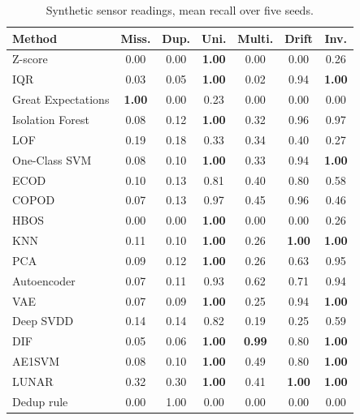 \documentclass[conference]{IEEEtran}
\begin{document}
\begin{table}[t]
\caption{Synthetic sensor readings, mean recall over five seeds.}
\label{tab:m-sensors}
\centering
\footnotesize
\setlength{\tabcolsep}{3pt}
\begin{tabular}{lcccccc}
\toprule
Method & Miss. & Dup. & Uni. & Multi. & Drift & Inv. \\
\midrule
Z-score            & 0.00 & 0.00 & \textbf{1.00} & 0.00 & 0.00 & 0.26 \\
IQR                & 0.03 & 0.05 & \textbf{1.00} & 0.02 & 0.94 & \textbf{1.00} \\
Great Expectations & \textbf{1.00} & 0.00 & 0.23 & 0.00 & 0.00 & 0.00 \\
\midrule
Isolation Forest   & 0.08 & 0.12 & \textbf{1.00} & 0.32 & 0.96 & 0.97 \\
LOF                & 0.19 & 0.18 & 0.33 & 0.34 & 0.40 & 0.27 \\
One-Class SVM      & 0.08 & 0.10 & \textbf{1.00} & 0.33 & 0.94 & \textbf{1.00} \\
ECOD               & 0.10 & 0.13 & 0.81 & 0.40 & 0.80 & 0.58 \\
COPOD              & 0.07 & 0.13 & 0.97 & 0.45 & 0.96 & 0.46 \\
HBOS               & 0.00 & 0.00 & \textbf{1.00} & 0.00 & 0.00 & 0.26 \\
KNN                & 0.11 & 0.10 & \textbf{1.00} & 0.26 & \textbf{1.00} & \textbf{1.00} \\
PCA                & 0.09 & 0.12 & \textbf{1.00} & 0.26 & 0.63 & 0.95 \\
\midrule
Autoencoder        & 0.07 & 0.11 & 0.93 & 0.62 & 0.71 & 0.94 \\
VAE                & 0.07 & 0.09 & \textbf{1.00} & 0.25 & 0.94 & \textbf{1.00} \\
Deep SVDD          & 0.14 & 0.14 & 0.82 & 0.19 & 0.25 & 0.59 \\
DIF                & 0.05 & 0.06 & \textbf{1.00} & \textbf{0.99} & 0.80 & \textbf{1.00} \\
AE1SVM             & 0.08 & 0.10 & \textbf{1.00} & 0.49 & 0.80 & \textbf{1.00} \\
LUNAR              & 0.32 & 0.30 & \textbf{1.00} & 0.41 & \textbf{1.00} & \textbf{1.00} \\
\midrule
Dedup rule         & 0.00 & 1.00 & 0.00 & 0.00 & 0.00 & 0.00 \\
\bottomrule
\end{tabular}
\end{table}
\end{document}
